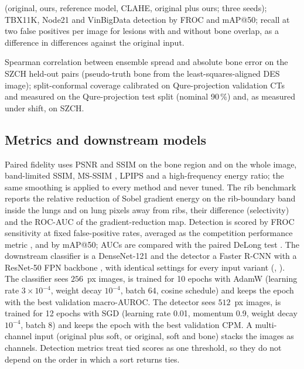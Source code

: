 \begin{description}
 (original, ours, reference model, CLAHE, original plus ours; three seeds); TBX11K, Node21 and VinBigData detection by FROC and mAP@50; recall at two false
 positives per image for lesions with and without bone overlap, as a difference in differences against the original input.
\item[H5$'$, reliability.] Spearman correlation between ensemble spread and absolute bone error on the SZCH held-out pairs (pseudo-truth bone from the
 least-squares-aligned DES image); split-conformal coverage calibrated on Qure-projection validation CTs and measured on the Qure-projection test split
 (nominal 90\,\%) and, as measured under shift, on SZCH.
\end{description}

\subsection{Metrics and downstream models}
Paired fidelity uses PSNR and SSIM \citep{wang2004ssim} on the bone region and on the whole image, band-limited SSIM, MS-SSIM \citep{wang2003msssim}, LPIPS \citep{zhang2018lpips}
and a high-frequency energy ratio; the same smoothing is applied to every method and never tuned. The rib benchmark reports the relative reduction of
Sobel gradient energy on the rib-boundary band inside the lungs and on lung pixels away from ribs, their difference (selectivity) and the ROC-AUC of the
gradient-reduction map. Detection is scored by FROC sensitivity at fixed false-positive rates, averaged as the competition performance metric
\citep{vanginneken2010anode09,niemeijer2011cpm}, and by mAP@50; AUCs are compared with the paired DeLong test \citep{delong1988auc}. The downstream classifier is a DenseNet-121
\citep{huang2017densenet} and the detector a Faster R-CNN with a ResNet-50 FPN backbone \citep{ren2017fasterrcnn}, with identical settings for every
input variant (, ). The classifier sees $256$~px images, is trained for 10 epochs with AdamW
\citep{loshchilov2019adamw} (learning rate $3\times10^{-4}$, weight decay $10^{-4}$, batch 64, cosine schedule) and keeps the epoch with the
best validation macro-AUROC. The detector sees $512$~px images, is trained for 12 epochs with SGD (learning rate 0.01, momentum 0.9, weight
decay $10^{-4}$, batch 8) and keeps the epoch with the best validation CPM. A multi-channel input (original plus soft, or original, soft and bone)
stacks the images as channels. Detection metrics treat tied scores as one threshold, so they do not depend on the order in which a sort
returns ties.

